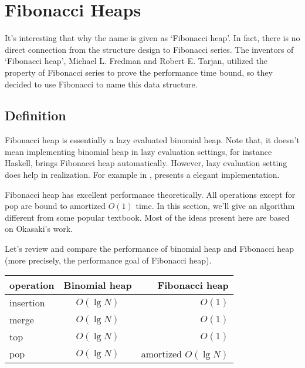 \documentclass{article}
\begin{document}
\section{Fibonacci Heaps}
\label{fib-heap}

It's interesting that why the name is given as `Fibonacci heap'.
In fact, there is no direct connection from the structure design
to Fibonacci series. The inventors of `Fibonacci heap', Michael L.
Fredman and Robert E. Tarjan, utilized the property of Fibonacci series
to prove the performance time bound, so they decided to use Fibonacci
to name this data structure.\cite{CLRS} 

\subsection{Definition}

Fibonacci heap is essentially a lazy evaluated binomial heap. Note
that, it doesn't mean implementing binomial heap in lazy evaluation
settings, for instance Haskell, brings Fibonacci heap automatically.
However, lazy evaluation setting does help in realization. For example
in \cite{hackage-fibq}, presents a elegant implementation.

Fibonacci heap has excellent performance theoretically. All operations
except for pop are bound to amortized $O(1)$ time. In this section,
we'll give an algorithm different from some popular textbook\cite{CLRS}.
Most of the ideas present here are based on Okasaki's work\cite{okasaki-fibh}.

Let's review and compare the performance of binomial heap and Fibonacci
heap (more precisely, the performance goal of Fibonacci heap).

\begin{tabular}{l | c | r}
  \hline
  operation & Binomial heap & Fibonacci heap \\
  \hline
  insertion & $O(\lg N)$ & $O(1)$ \\
  merge & $O(\lg N)$ & $O(1)$ \\
  top & $O(\lg N)$ & $O(1)$ \\
  pop & $O(\lg N)$ & amortized $O(\lg N)$ \\
  \hline
\end{tabular}
\end{document}
